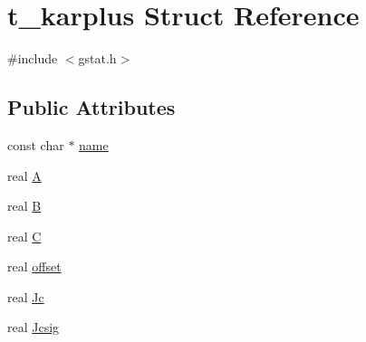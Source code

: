 \hypertarget{structt__karplus}{\section{t\-\_\-karplus \-Struct \-Reference}
\label{structt__karplus}
}


{\ttfamily \#include $<$gstat.\-h$>$}

\subsection*{\-Public \-Attributes}
\begin{DoxyCompactItemize}
\item 
const char $\ast$ \hyperlink{structt__karplus_adab1bc4d8afd2e8423204f0ff4f1f6fa}{name}
\item 
real \hyperlink{structt__karplus_a64462f049206b6e6f4b14df1e07f42e9}{\-A}
\item 
real \hyperlink{structt__karplus_ad33849c507587b6b27042b9f8d586d76}{\-B}
\item 
real \hyperlink{structt__karplus_ae279fc4e14d35ddd3261f53610cb7139}{\-C}
\item 
real \hyperlink{structt__karplus_acdd4e5ec9a4a938c9844bbae6205ba35}{offset}
\item 
real \hyperlink{structt__karplus_a50e969c1dea12eb4b89c353c802a72e7}{\-Jc}
\item 
real \hyperlink{structt__karplus_a107287868225d1aba3253324437fbdcc}{\-Jcsig}
\end{DoxyCompactItemize}


